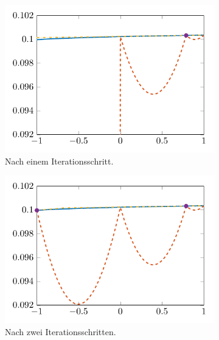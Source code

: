 \documentclass[../main.tex]{subfiles}
\begin{document}
\begin{figure}[tb]
    \centering
    \begin{subfigure}[b]{0.495\textwidth}
        \centering
        \includegraphics[width=1\textwidth]{figures/chapter5/ch5ex1_scm_plot_1.pdf}
        \caption{Nach einem Iterationsschritt.}
    \end{subfigure}
    \begin{subfigure}[b]{0.495\textwidth}
        \centering
        \includegraphics[width=1\textwidth]{figures/chapter5/ch5ex1_scm_plot_2.pdf}
        \caption{Nach zwei Iterationsschritten.}
    \end{subfigure}\\
    \begin{subfigure}[b]{0.495\textwidth}
        \centering

\end{subfigure}
\end{figure}
\end{document}
